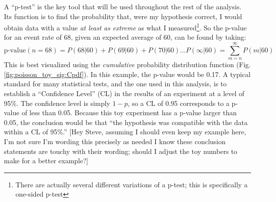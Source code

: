     \FloatBarrier
    A ``p-test'' is the key tool that will be used throughout the rest of the analysis.
    Its function is to find the probability that, were my hypothesis correct,
        I would obtain data with a value \textit{at least as extreme} as what I measured\footnote{
            There are actually several different variations of a p-test;
            this is specifically a one-sided p-test}.
    So the p-value for an event rate of 68, given an expected average of 60, can be found by taking:
    \begin{equation}
        \textrm{p-value}(n=68) = P(68|60) + P(69|60) + P(70|60) ... P(\infty|60) = \sum\limits_{m=n}^\infty P(m|60)
    \end{equation}
    This is best visualized using the \textit{cumulative} probability distribution function (Fig. \ref{fig:poisson_toy_sig:Cpdf}).
    In this example, the p-value would be 0.17.
    A typical standard for many statistical tests, and the one used in this analysis,
        is to establish a ``Confidence Level'' (CL) in the results of an experiment at a level of 95\%. 
    The confidence level is simply $1-p$, so a CL of 0.95 corresponds to a p-value of less than 0.05.
    Because this toy experiment has a p-value larger than 0.05,
        the conclusion would be that ``the hypothesis was compatible with the data within a CL of 95\%.''
    [Hey Steve, assuming I should even keep my example here, I'm not sure I'm wording this precisely as needed 
        I know these conclusion statements are touchy with their wording;
        should I adjust the toy numbers to make for a better example?]


